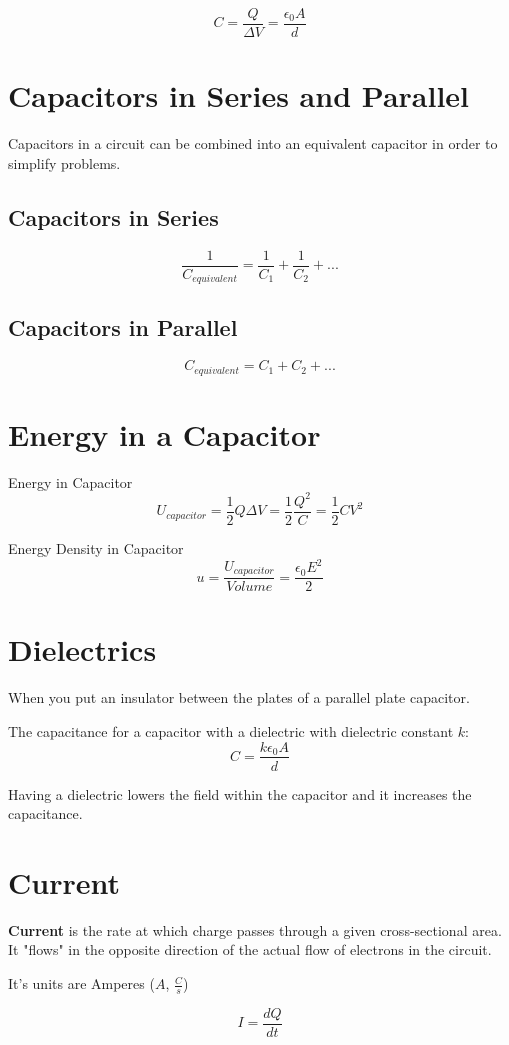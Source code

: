 \documentclass[10pt, a4paper, twocolumn]{article}
\begin{document}
    $$C = \frac{Q}{\Delta V} = \frac{\epsilon_0 A}{d}$$ 


    \section{Capacitors in Series and Parallel}	
        Capacitors in a circuit can be combined into an equivalent capacitor in order to simplify problems.
        \subsection{Capacitors in Series}
        $$\frac{1}{C_{equivalent}} = \frac{1}{C_1} + \frac{1}{C_2} + ...$$
        \subsection{Capacitors in Parallel}
        $$C_{equivalent} = C_1 + C_2 + ...$$
    \section{Energy in a Capacitor}	
        Energy in Capacitor
        $$U_{capacitor} = \frac{1}{2}Q \Delta V = \frac{1}{2} \frac{Q^2}{C} = \frac{1}{2} C V^2$$

        Energy Density in Capacitor
        $$u = \frac{U_{capacitor}}{Volume} = \frac{\epsilon_0 E^2}{2}$$
    \section{Dielectrics}	
        When you put an insulator between the plates of a parallel plate capacitor.

        The capacitance for a capacitor with a dielectric with dielectric constant $k$:
        $$C = \frac{k \epsilon_0 A}{d}$$

        Having a dielectric lowers the field within the capacitor and it increases the capacitance.
    \section{Current}	
        \textbf{Current} is the rate at which charge passes through a given cross-sectional area. It "flows" in the opposite direction of the actual flow of electrons in the circuit.

        It's units are Amperes ($A$, $\frac{C}{s}$)

        $$I = \frac{dQ}{dt}$$
\end{document}

